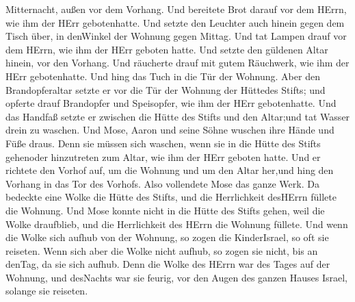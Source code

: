 Mitternacht, außen vor dem Vorhang.  Und bereitete Brot
darauf vor dem HErrn, wie ihm der HErr gebotenhatte.  Und
setzte den Leuchter auch hinein gegen dem Tisch über, in denWinkel der
Wohnung gegen Mittag.  Und tat Lampen drauf vor dem HErrn,
wie ihm der HErr geboten hatte.  Und setzte den güldenen
Altar hinein, vor den Vorhang.  Und räucherte drauf mit
gutem Räuchwerk, wie ihm der HErr gebotenhatte.  Und hing
das Tuch in die Tür der Wohnung.  Aber den Brandopferaltar
setzte er vor die Tür der Wohnung der Hüttedes Stifts; und opferte drauf
Brandopfer und Speisopfer, wie ihm der HErr gebotenhatte. 
Und das Handfaß setzte er zwischen die Hütte des Stifts und den
Altar;und tat Wasser drein zu waschen.  Und Mose, Aaron und
seine Söhne wuschen ihre Hände und Füße draus.  Denn sie
müssen sich waschen, wenn sie in die Hütte des Stifts gehenoder
hinzutreten zum Altar, wie ihm der HErr geboten hatte.  Und
er richtete den Vorhof auf, um die Wohnung und um den Altar her,und hing
den Vorhang in das Tor des Vorhofs. Also vollendete Mose das ganze Werk.
 Da bedeckte eine Wolke die Hütte des Stifts, und die
Herrlichkeit desHErrn füllete die Wohnung.  Und Mose konnte
nicht in die Hütte des Stifts gehen, weil die Wolke draufblieb, und die
Herrlichkeit des HErrn die Wohnung füllete.  Und wenn die
Wolke sich aufhub von der Wohnung, so zogen die KinderIsrael, so oft sie
reiseten.  Wenn sich aber die Wolke nicht aufhub, so zogen
sie nicht, bis an denTag, da sie sich aufhub.  Denn die
Wolke des HErrn war des Tages auf der Wohnung, und desNachts war sie
feurig, vor den Augen des ganzen Hauses Israel, solange sie reiseten.
